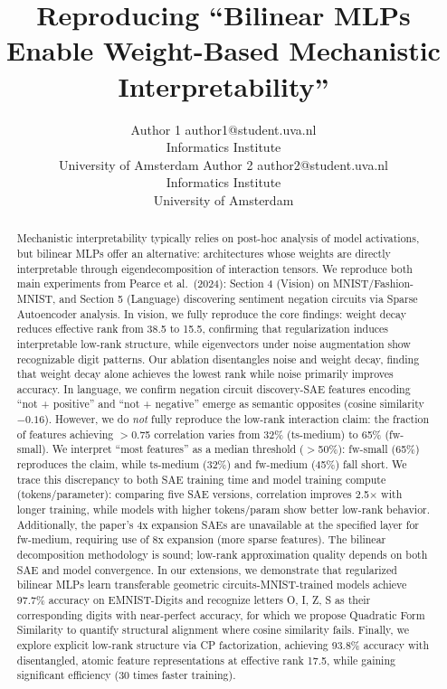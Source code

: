 \documentclass[10pt]{article}
\title{Reproducing ``Bilinear MLPs Enable Weight-Based Mechanistic Interpretability''}
\author{\name Author 1 \email author1@student.uva.nl \\
      \addr Informatics Institute\\
      University of Amsterdam
      \AND
      \name Author 2 \email author2@student.uva.nl \\
      \addr Informatics Institute\\
      University of Amsterdam}
\begin{document}
\maketitle

\begin{abstract}
Mechanistic interpretability typically relies on post-hoc analysis of model activations, but bilinear MLPs offer an alternative: architectures whose weights are directly interpretable through eigendecomposition of interaction tensors.
We reproduce both main experiments from Pearce et al.\ (2024): Section 4 (Vision) on MNIST/Fashion-MNIST, and Section 5 (Language) discovering sentiment negation circuits via Sparse Autoencoder analysis.
In vision, we fully reproduce the core findings: weight decay reduces effective rank from 38.5 to 15.5, confirming that regularization induces interpretable low-rank structure, while eigenvectors under noise augmentation show recognizable digit patterns.
Our ablation disentangles noise and weight decay, finding that weight decay alone achieves the lowest rank while noise primarily improves accuracy.
In language, we confirm negation circuit discovery-SAE features encoding ``not + positive'' and ``not + negative'' emerge as semantic opposites (cosine similarity $-0.16$).
However, we do \emph{not} fully reproduce the low-rank interaction claim: the fraction of features achieving $>$0.75 correlation varies from 32\% (ts-medium) to 65\% (fw-small).
We interpret ``most features'' as a median threshold ($>$50\%): fw-small (65\%) reproduces the claim, while ts-medium (32\%) and fw-medium (45\%) fall short.
We trace this discrepancy to both SAE training time and model training compute (tokens/parameter): comparing five SAE versions, correlation improves 2.5$\times$ with longer training, while models with higher tokens/param show better low-rank behavior.
Additionally, the paper's 4x expansion SAEs are unavailable at the specified layer for fw-medium, requiring use of 8x expansion (more sparse features).
The bilinear decomposition methodology is sound; low-rank approximation quality depends on both SAE and model convergence.
In our extensions, we demonstrate that regularized bilinear MLPs learn transferable geometric circuits-MNIST-trained models achieve 97.7\% accuracy on EMNIST-Digits and recognize letters O, I, Z, S as their corresponding digits with near-perfect accuracy, for which we propose Quadratic Form Similarity to quantify structural alignment where cosine similarity fails.
Finally, we explore explicit low-rank structure via CP factorization, achieving 93.8\% accuracy with disentangled, atomic feature representations at effective rank 17.5, while gaining significant efficiency (30 times faster training).
\end{abstract}
\end{document}
